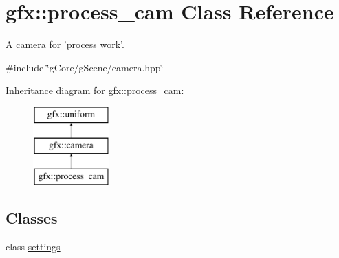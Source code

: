 \hypertarget{classgfx_1_1process__cam}{\section{gfx\-:\-:process\-\_\-cam Class Reference}
\label{classgfx_1_1process__cam}
}


A camera for 'process work'.  




{\ttfamily \#include \char`\"{}g\-Core/g\-Scene/camera.\-hpp\char`\"{}}

Inheritance diagram for gfx\-:\-:process\-\_\-cam\-:\begin{figure}[H]
\begin{center}
\leavevmode
\includegraphics[height=3.000000cm]{classgfx_1_1process__cam}
\end{center}
\end{figure}
\subsection*{Classes}
\begin{DoxyCompactItemize}
\item 
class \hyperlink{classgfx_1_1process__cam_1_1settings}{settings}
\end{DoxyCompactItemize}
